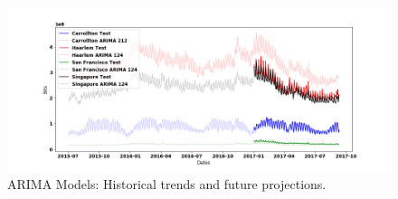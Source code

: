 \begin{figure}[h]
\centering
    \includegraphics[scale=0.4]{traffic_profile/images/_arima.png}
    \caption[Network Diagram]{ARIMA Models: Historical trends and future projections.}
\label{arima}
\end{figure}